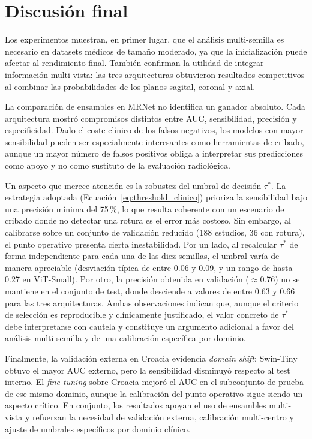 \section{Discusión final}
\label{subsec:discusion_general_resultados}

Los experimentos muestran, en primer lugar, que el análisis multi-semilla es necesario en datasets médicos de tamaño moderado, ya que la inicialización puede afectar al rendimiento final. También confirman la utilidad de integrar información multi-vista: las tres arquitecturas obtuvieron resultados competitivos al combinar las probabilidades de los planos sagital, coronal y axial.

La comparación de ensambles en MRNet no identifica un ganador absoluto. Cada arquitectura mostró compromisos distintos entre AUC, sensibilidad, precisión y especificidad. Dado el coste clínico de los falsos negativos, los modelos con mayor sensibilidad pueden ser especialmente interesantes como herramientas de cribado, aunque un mayor número de falsos positivos obliga a interpretar sus predicciones como apoyo y no como sustituto de la evaluación radiológica.

Un aspecto que merece atención es la robustez del umbral de decisión $\tau^*$. La estrategia adoptada (Ecuación~\ref{eq:threshold_clinico}) prioriza la sensibilidad bajo una precisión mínima del 75\,\%, lo que resulta coherente con un escenario de cribado donde no detectar una rotura es el error más costoso. Sin embargo, al calibrarse sobre un conjunto de validación reducido (188 estudios, 36 con rotura), el punto operativo presenta cierta inestabilidad. Por un lado, al recalcular $\tau^*$ de forma independiente para cada una de las diez semillas, el umbral varía de manera apreciable (desviación típica de entre 0.06 y 0.09, y un rango de hasta 0.27 en ViT-Small). Por otro, la precisión obtenida en validación ($\approx$0.76) no se mantiene en el conjunto de test, donde desciende a valores de entre 0.63 y 0.66 para las tres arquitecturas. Ambas observaciones indican que, aunque el criterio de selección es reproducible y clínicamente justificado, el valor concreto de $\tau^*$ debe interpretarse con cautela y constituye un argumento adicional a favor del análisis multi-semilla y de una calibración específica por dominio.

Finalmente, la validación externa en Croacia evidencia \textit{domain shift}: Swin-Tiny obtuvo el mayor AUC externo, pero la sensibilidad disminuyó respecto al test interno. El \textit{fine-tuning} sobre Croacia mejoró el AUC en el subconjunto de prueba de ese mismo dominio, aunque la calibración del punto operativo sigue siendo un aspecto crítico. En conjunto, los resultados apoyan el uso de ensambles multi-vista y refuerzan la necesidad de validación externa, calibración multi-centro y ajuste de umbrales específicos por dominio clínico.